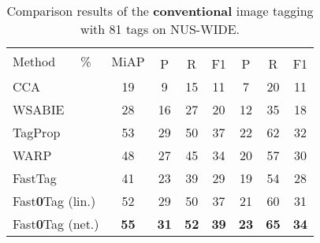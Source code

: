 \documentclass[10pt,twocolumn,letterpaper]{article}
\begin{document}
\begin{table}
\centering
\caption{Comparison results of the \textbf{conventional} image tagging with 81 tags on NUS-WIDE. }
\vspace{-7pt}
\label{tConventional}
\small
\begin{tabular}{|l|c|c|c|c|c|c|c|}
\hline
\multirow{2}{*}{ Method~~~~\%} & \multirow{2}{*}{ MiAP} & \multicolumn{3}{c|}{} & \multicolumn{3}{|c|}{}\\
    & \multirow{1}{*}{} & P & R  & { F1} & P & R & { F1} \\
    
\hline\hline
{CCA} & 19 &  9 & 15 & 11 & 7 & 20 & 11\\
\hline
{WSABIE}~\cite{weston_wsabie:_2011} & 28 &  16 & 27 & 20 & 12 & 35 & 18\\
\hline
{TagProp}~\cite{guillaumin_tagprop:_2009} & 53 &  29 & 50 & 37 & 22 & 62 & 32\\
\hline
{WARP}~\cite{gong_deep_2013} & 48 &  27 & 45 & 34 &  20 & 57 & 30\\
\hline
{FastTag}~\cite{chen_fast_2013} & 41 & 23 & 39 & 29 & 19 & 54 & 28\\
\hline
{Fast\textbf{0}Tag (lin.)}& 52 &29& 50 & 37 & 21 & 60 & 31\\
\hline
{Fast\textbf{0}Tag (net.)} & {\bf 55} &  {\bf 31} & {\bf 52} & {\bf 39} & {\bf 23} & {\bf 65} & {\bf 34}\\
\hline
\end{tabular}
\vspace{-10pt}
\end{table}
\end{document}
